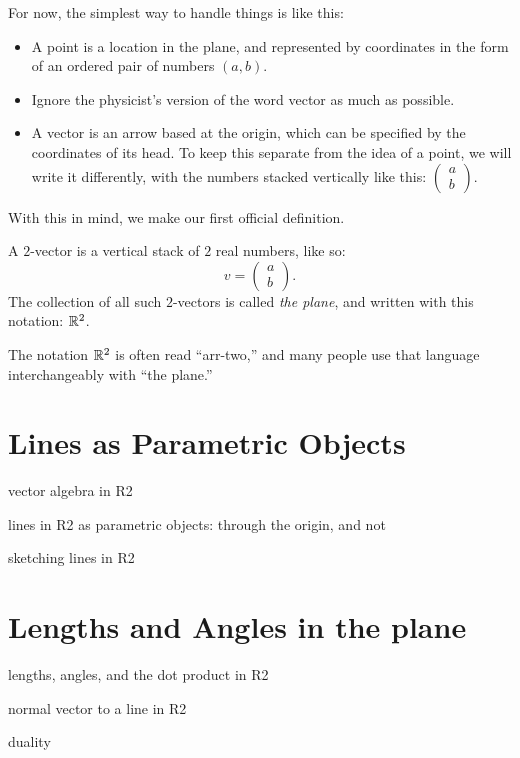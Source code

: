 \documentclass[00-livre-main.tex]{subfiles}
\begin{document}
For now, the simplest way to handle things is like this:
\begin{itemize}
\item A point is a location in the plane, and represented by coordinates in the form of an ordered pair of numbers $(a,b)$.
\item Ignore the physicist's version of the word vector as much as possible.
\item A vector is an arrow based at the origin, which can be specified by the coordinates of its head. To keep this separate from the idea of a point, we will write it differently, with the numbers stacked vertically like this: $\left(\begin{smallmatrix} a \\ b \end{smallmatrix}\right)$.
\end{itemize}
With this in mind, we make our first official definition.

\begin{definition} A $2$-vector is a vertical stack of $2$ real numbers, like so:
\[
v = \begin{pmatrix} a \\ b \end{pmatrix}.
\]
The collection of all such $2$-vectors is called \emph{the plane}, and written with this notation: $\mathbb{R}^2$.
\end{definition}

The notation $\mathbb{R}^2$ is often read ``arr-two,'' and many people use that language interchangeably with ``the plane.''


\section*{Lines as Parametric Objects}

\begin{compactitem}
\item vector algebra in R2
\item lines in R2 as parametric objects: through the origin, and not
\item sketching lines in R2
\end{compactitem}

\section*{Lengths and Angles in the plane}
\begin{compactitem}
\item lengths, angles, and the dot product in R2
\item normal vector to a line in R2
\item duality
\end{compactitem}
\end{document}
